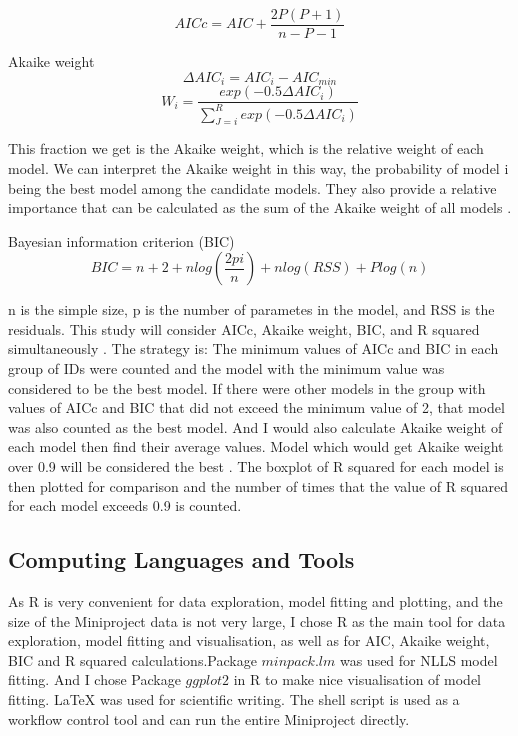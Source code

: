 \documentclass[11pt]{article}
\begin{document}
\begin{linenumbers}
      \begin{equation}
        AICc = AIC + \frac{2 P (P + 1)}{n - P - 1}
      \end{equation}

    Akaike weight
      \begin{equation}
        \Delta AIC_i = AIC_i - AIC_{min}
      \end{equation}
      \begin{equation}
        W_i = \frac{exp(-0.5 \Delta AIC_i)}{\sum_{J=i}^R exp(-0.5 \Delta AIC_i)}
      \end{equation}

    This fraction we get is the Akaike weight, which is the relative weight of each model. We can interpret the Akaike weight in this way, the probability of model i being the best model among the candidate models. They also provide a relative importance that can be calculated as the sum of the Akaike weight of all models \cite{johnson2004model}.

    Bayesian information criterion (BIC)
      \begin{equation} 
        BIC = n + 2 + n log(\frac{2 pi}{n}) + n log(RSS) + P log(n) 
      \end{equation} 

    n is the simple size, p is the number of parametes in the model, and RSS is the residuals. This study will consider AICc, Akaike weight, BIC, and R squared simultaneously . The strategy is:
    The minimum values of AICc and BIC in each group of IDs were counted and the model with the minimum value was considered to be the best model. If there were other models in the group with values of AICc and BIC that did not exceed the minimum value of 2, that model was also counted as the best model. And I would also calculate Akaike weight of each model then find their average values. Model which would get Akaike weight over 0.9 will be considered the best \cite{johnson2004model}. The boxplot of R squared for each model is then plotted for comparison and the number of times that the value of R squared for each model exceeds 0.9 is counted.

      \subsection{Computing Languages and Tools}

    As R is very convenient for data exploration, model fitting and plotting, and the size of the Miniproject data is not very large, I chose R as the main tool for data exploration, model fitting and visualisation, as well as for AIC, Akaike weight, BIC and R squared calculations.Package $minpack.lm$ was used for NLLS model fitting. And I chose Package $ggplot2$ in R to make nice visualisation of model fitting. LaTeX was used for scientific writing. The shell script is used as a workflow control tool and can run the entire Miniproject directly.


\end{linenumbers}
\end{document}
